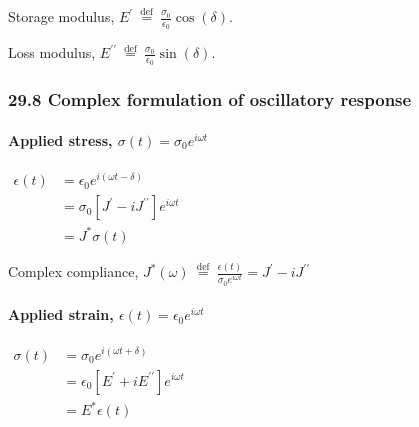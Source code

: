Storage modulus,
\(E^{\prime} \stackrel{\text { def }}{=} \frac{\sigma_{0}}{\epsilon_{0}} \cos (\delta)\).

Loss modulus,
\(E^{\prime \prime} \stackrel{\text { def }}{=} \frac{\sigma_{0}}{\epsilon_{0}} \sin (\delta)\).

\hypertarget{complex-formulation-of-oscillatory-response}{%
\subsubsection{29.8 Complex formulation of oscillatory
response}\label{complex-formulation-of-oscillatory-response}}

\hypertarget{applied-stress-sigmatsigma_0-ei-omega-t}{%
\paragraph{\texorpdfstring{Applied stress,
\(\sigma(t)=\sigma_{0} e^{i \omega t}\)}{Applied stress, \textbackslash sigma(t)=\textbackslash sigma\_\{0\} e\^{}\{i \textbackslash omega t\}}}\label{applied-stress-sigmatsigma_0-ei-omega-t}}

\(\begin{aligned} \epsilon(t) &=\epsilon_{0} e^{i(\omega t-\delta)} \\ &=\sigma_{0}\left[J^{\prime}-i J^{\prime \prime}\right] e^{i \omega t}\\ & =J^{*} \sigma(t)\end{aligned}\)

Complex compliance,
\(J^{*}(\omega) \stackrel{\text { def }}{=} \frac{\epsilon(t)}{\sigma_{0} e^{i \omega t}}=J^{\prime}-i J^{\prime \prime}\)

\hypertarget{applied-strain-epsilontepsilon_0-ei-omega-t}{%
\paragraph{\texorpdfstring{Applied strain,
\(\epsilon(t)=\epsilon_{0} e^{i \omega t}\)}{Applied strain, \textbackslash epsilon(t)=\textbackslash epsilon\_\{0\} e\^{}\{i \textbackslash omega t\}}}\label{applied-strain-epsilontepsilon_0-ei-omega-t}}

\(\begin{aligned} \sigma(t) &=\sigma_{0} e^{i(\omega t+\delta)} \\ &=\epsilon_{0}\left[E^{\prime}+i E^{\prime \prime}\right] e^{i \omega t} \\ & =E^{*} \epsilon(t)\end{aligned}\)


